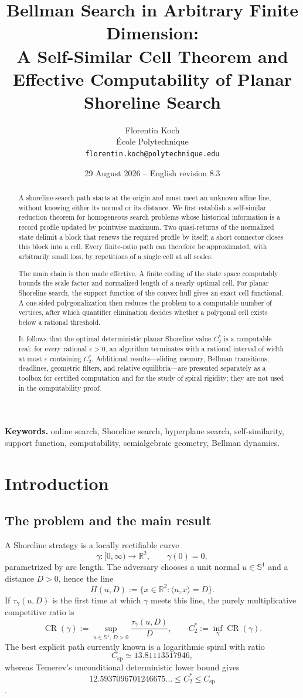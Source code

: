 \documentclass[10pt,a4paper]{article}
\title{\textbf{Bellman Search in Arbitrary Finite Dimension:}\\
A Self-Similar Cell Theorem and Effective Computability of Planar Shoreline Search}
\author{Florentin Koch\\[0.3em]
\normalsize \'Ecole Polytechnique\\
\normalsize \texttt{florentin.koch@polytechnique.edu}}
\date{29 August 2026 -- English revision 8.3}
\theoremstyle{definition}
\theoremstyle{remark}
\DeclareMathOperator{\CR}{CR}
\newcommand{\R}{\mathbb{R}}
\newcommand{\Sph}{\mathbb{S}}
\newcommand{\ip}[2]{\langle #1,#2\rangle}
\newcommand{\eps}{\varepsilon}
\newcommand{\spc}{C_{\mathrm{sp}}}
\begin{document}
\maketitle


\begin{abstract}
A shoreline-search path starts at the origin and must meet an unknown affine line, without knowing either its normal or its distance. We first establish a self-similar reduction theorem for homogeneous search problems whose historical information is a record profile updated by pointwise maximum. Two quasi-returns of the normalized state delimit a block that renews the required profile by itself; a short connector closes this block into a cell. Every finite-ratio path can therefore be approximated, with arbitrarily small loss, by repetitions of a single cell at all scales.

The main chain is then made effective. A finite coding of the state space computably bounds the scale factor and normalized length of a nearly optimal cell. For planar Shoreline search, the support function of the convex hull gives an exact cell functional. A one-sided polygonalization then reduces the problem to a computable number of vertices, after which quantifier elimination decides whether a polygonal cell exists below a rational threshold.

It follows that the optimal deterministic planar Shoreline value $C_2^*$ is a computable real: for every rational $\eps>0$, an algorithm terminates with a rational interval of width at most $\eps$ containing $C_2^*$. Additional results---sliding memory, Bellman transitions, deadlines, geometric filters, and relative equilibria---are presented separately as a toolbox for certified computation and for the study of spiral rigidity; they are not used in the computability proof.
\end{abstract}

\noindent\textbf{Keywords.} online search, Shoreline search, hyperplane search, self-similarity, support function, computability, semialgebraic geometry, Bellman dynamics.

\section{Introduction}
\subsection{The problem and the main result}
A Shoreline strategy is a locally rectifiable curve
\[
  \gamma:[0,\infty)\longrightarrow \R^2,\qquad \gamma(0)=0,
\]
parametrized by arc length. The adversary chooses a unit normal $u\in\Sph^1$ and a distance $D>0$, hence the line
\[
  H(u,D):=\{x\in\R^2:\ip{u}{x}=D\}.
\]
If $\tau_\gamma(u,D)$ is the first time at which $\gamma$ meets this line, the purely multiplicative competitive ratio is
\[
  \CR(\gamma):=\sup_{u\in\Sph^1,\,D>0}\frac{\tau_\gamma(u,D)}{D},
  \qquad
  C_2^*:=\inf_\gamma \CR(\gamma).
\]
The best explicit path currently known is a logarithmic spiral with ratio
\[
  \spc\simeq 13.81113517946,
\]
whereas Temerev's unconditional deterministic lower bound gives
\[
  12.5937096701246675\ldots\le C_2^*\le \spc
\]
\cite{FinchZhu,FinchSpiral,Temerev}.
\end{document}
